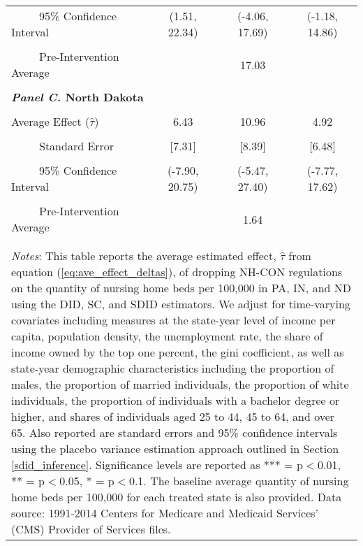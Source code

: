 \documentclass[12pt]{article}
\begin{document}
\begin{table}[htbp]
\begin{tabular}{l*{3}{c}}
\\[-2ex]
\multicolumn{1}{l}{\ \ \ \ \ 95\% Confidence Interval}&   \multicolumn{1}{c}{(1.51, 22.34)}&   \multicolumn{1}{c}{(-4.06, 17.69)}&   \multicolumn{1}{c}{(-1.18, 14.86)}\\
\\[-2ex]
\multicolumn{1}{l}{\ \ \ \ \ Pre-Intervention Average}&   \multicolumn{3}{c}{17.03}\\
\\[-.1ex]
\multicolumn{4}{l}{\textbf{\textit{Panel C.} North Dakota}}\\
\\[-1.5ex]
\multicolumn{1}{l}{Average Effect ($\hat{\tau}$)}&   \multicolumn{1}{c}{6.43}&   \multicolumn{1}{c}{10.96}&  \multicolumn{1}{c}{4.92}\\
\\[-2ex]
\multicolumn{1}{l}{\ \ \ \ \ Standard Error}  &\multicolumn{1}{c}{[7.31]}&\multicolumn{1}{c}{[8.39]}&\multicolumn{1}{c}{[6.48]}\\
\\[-2ex]
\multicolumn{1}{l}{\ \ \ \ \ 95\% Confidence Interval}&   \multicolumn{1}{c}{(-7.90, 20.75)}&   \multicolumn{1}{c}{(-5.47, 27.40)}&   \multicolumn{1}{c}{(-7.77, 17.62)}\\
\\[-2ex]
\multicolumn{1}{l}{\ \ \ \ \ Pre-Intervention Average}&   \multicolumn{3}{c}{1.64}\\
\\[-.1ex]
\hline\hline
\\[-2ex]
\multicolumn{4}{p{.75\linewidth}}{\footnotesize \textit{Notes}: This table reports the average estimated effect, $\hat{\tau}$ from equation (\ref{eq:ave_effect_deltas}), of dropping NH-CON regulations on the quantity of nursing home beds per 100,000 in PA, IN, and ND using the DID, SC, and SDID estimators. We adjust for time-varying covariates including measures at the state-year level of income per capita, population density, the unemployment rate, the share of income owned by the top one percent, the gini coefficient, as well as state-year demographic characteristics including the proportion of males, the proportion of married individuals, the proportion of white individuals, the proportion of individuals with a bachelor degree or higher, and shares of individuals aged 25 to 44, 45 to 64, and over 65. Also reported are standard errors and 95\% confidence intervals using the placebo variance estimation approach outlined in Section \ref{sdid_inference}. Significance levels are reported as *** = p$<$0.01, ** = p$<$0.05, * = p$<$0.1. The baseline average quantity of nursing home beds per 100,000 for each treated state is also provided. Data source: 1991-2014 Centers for Medicare and Medicaid Services’ (CMS) Provider of Services files.}
\end{tabular}
\end{table}
\vfill
\end{document}
